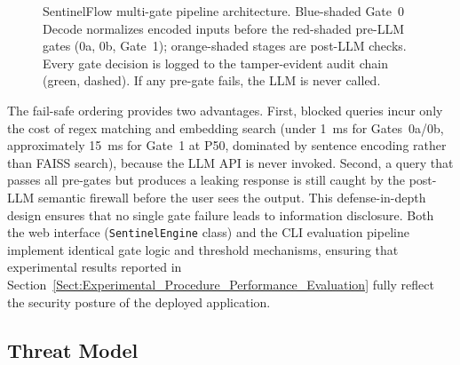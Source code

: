 \documentclass[journal]{IEEEtran}
\begin{document}
\begin{figure}[!ht]
\caption{SentinelFlow multi-gate pipeline architecture. Blue-shaded Gate~0 Decode normalizes encoded inputs before the red-shaded pre-LLM gates (0a, 0b, Gate~1); orange-shaded stages are post-LLM checks. Every gate decision is logged to the tamper-evident audit chain (green, dashed). If any pre-gate fails, the LLM is never called.}
\label{fig:architecture}
\end{figure}

The fail-safe ordering provides two advantages. First, blocked queries incur only the cost of regex matching and embedding search (under 1~ms for Gates~0a/0b, approximately 15~ms for Gate~1 at P50, dominated by sentence encoding rather than FAISS search), because the LLM API is never invoked. Second, a query that passes all pre-gates but produces a leaking response is still caught by the post-LLM semantic firewall before the user sees the output. This defense-in-depth design ensures that no single gate failure leads to information disclosure. Both the web interface (\texttt{SentinelEngine} class) and the CLI evaluation pipeline implement identical gate logic and threshold mechanisms, ensuring that experimental results reported in Section~\ref{Sect:Experimental_Procedure_Performance_Evaluation} fully reflect the security posture of the deployed application.

\subsection{Threat Model}
\label{Sect:Threat_Model}
\end{document}
